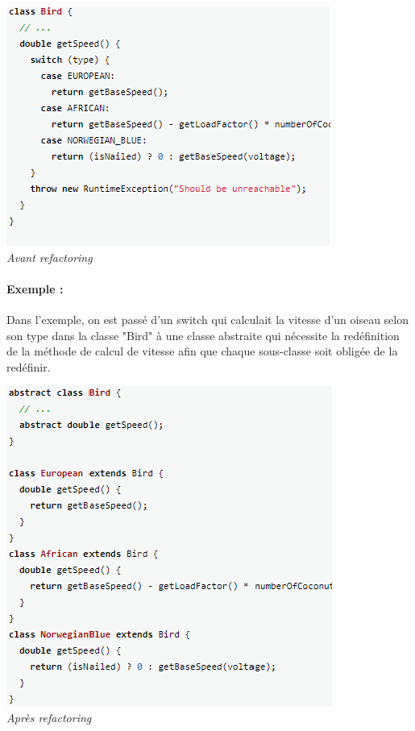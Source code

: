 \documentclass[a4paper,twoside,12pt,openright]{report}
\begin{document}
\begin{center}
\includegraphics[scale=1]{Image/ReplaceConditionalPoly.png}\\
\itshape{Avant refactoring \cite{ref5}}
\end{center}

\paragraph{Exemple :}
Dans l'exemple, on est passé d'un switch qui calculait la vitesse d'un oiseau selon son type dans la classe "Bird" à une classe abstraite qui nécessite la redéfinition de la méthode de calcul de vitesse afin que chaque sous-classe soit obligée de la redéfinir.

\begin{center}
\includegraphics[scale=1]{Image/ReplaceConditionalPoly2.png}\\
\itshape{Après refactoring \cite{ref5}}
\end{center}
\end{document}
